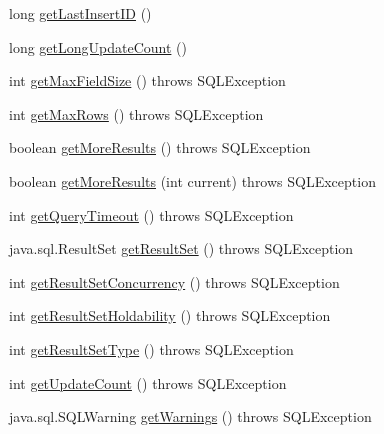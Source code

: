 \begin{DoxyCompactItemize}
long \mbox{\hyperlink{classcom_1_1mysql_1_1cj_1_1jdbc_1_1_statement_impl_af48b4bdf41d529d92def194cbe611acf}{get\+Last\+Insert\+ID}} ()
\item 
long \mbox{\hyperlink{classcom_1_1mysql_1_1cj_1_1jdbc_1_1_statement_impl_a05b7122d9eb36876362b1e526e9dfd38}{get\+Long\+Update\+Count}} ()
\item 
int \mbox{\hyperlink{classcom_1_1mysql_1_1cj_1_1jdbc_1_1_statement_impl_a1dbdd8b00e13cbaadf54920e8d93075d}{get\+Max\+Field\+Size}} ()  throws S\+Q\+L\+Exception 
\item 
int \mbox{\hyperlink{classcom_1_1mysql_1_1cj_1_1jdbc_1_1_statement_impl_ae2447bc18fbb4aba8ef64f48f0c90c36}{get\+Max\+Rows}} ()  throws S\+Q\+L\+Exception 
\item 
boolean \mbox{\hyperlink{classcom_1_1mysql_1_1cj_1_1jdbc_1_1_statement_impl_a0791ff241a89529adb0be7da26a0ec62}{get\+More\+Results}} ()  throws S\+Q\+L\+Exception 
\item 
boolean \mbox{\hyperlink{classcom_1_1mysql_1_1cj_1_1jdbc_1_1_statement_impl_a2cf53265012d4410f8090334c4837e81}{get\+More\+Results}} (int current)  throws S\+Q\+L\+Exception 
\item 
int \mbox{\hyperlink{classcom_1_1mysql_1_1cj_1_1jdbc_1_1_statement_impl_acc6d1eb26165bde353224ca1c5d9f4cb}{get\+Query\+Timeout}} ()  throws S\+Q\+L\+Exception 
\item 
java.\+sql.\+Result\+Set \mbox{\hyperlink{classcom_1_1mysql_1_1cj_1_1jdbc_1_1_statement_impl_a8bf30f2ecfd13ebcfbde03b082172bb1}{get\+Result\+Set}} ()  throws S\+Q\+L\+Exception 
\item 
int \mbox{\hyperlink{classcom_1_1mysql_1_1cj_1_1jdbc_1_1_statement_impl_a4a5fa990b06601f984e4393d6cb02b26}{get\+Result\+Set\+Concurrency}} ()  throws S\+Q\+L\+Exception 
\item 
int \mbox{\hyperlink{classcom_1_1mysql_1_1cj_1_1jdbc_1_1_statement_impl_a84b0f5b22d3ce2bd808aceb6c17e4620}{get\+Result\+Set\+Holdability}} ()  throws S\+Q\+L\+Exception 
\item 
int \mbox{\hyperlink{classcom_1_1mysql_1_1cj_1_1jdbc_1_1_statement_impl_a0845a6219a16770f3675269fc28ade3b}{get\+Result\+Set\+Type}} ()  throws S\+Q\+L\+Exception 
\item 
int \mbox{\hyperlink{classcom_1_1mysql_1_1cj_1_1jdbc_1_1_statement_impl_abb1d31f01f22e76a4d2a03c26905cb2e}{get\+Update\+Count}} ()  throws S\+Q\+L\+Exception 
\item 
java.\+sql.\+S\+Q\+L\+Warning \mbox{\hyperlink{classcom_1_1mysql_1_1cj_1_1jdbc_1_1_statement_impl_aeeda73d9ee01ed8c74d90c4014614412}{get\+Warnings}} ()  throws S\+Q\+L\+Exception 

\end{DoxyCompactItemize}
